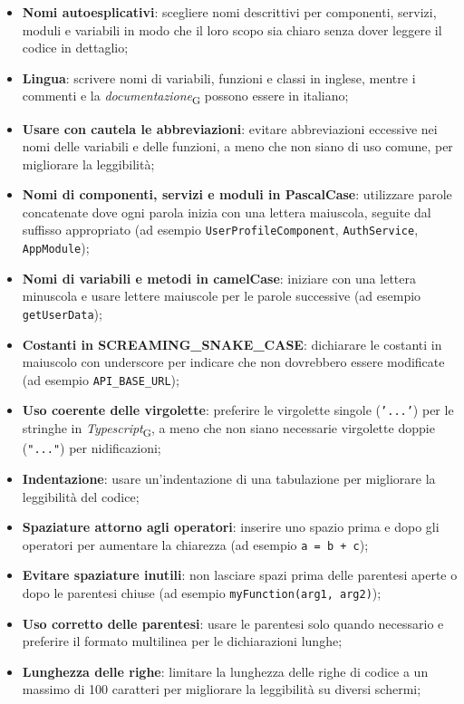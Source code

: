 \begin{itemize}
    \item \textbf{Nomi autoesplicativi}: scegliere nomi descrittivi per componenti, servizi, moduli e variabili in modo che il loro scopo sia chiaro senza dover leggere il codice in dettaglio;
    \item \textbf{Lingua}: scrivere nomi di variabili, funzioni e classi in inglese, mentre i commenti e la \textit{documentazione}\textsubscript{G} possono essere in italiano;
    \item \textbf{Usare con cautela le abbreviazioni}: evitare abbreviazioni eccessive nei nomi delle variabili e delle funzioni, a meno che non siano di uso comune, per migliorare la leggibilità;
    \item \textbf{Nomi di componenti, servizi e moduli in PascalCase}: utilizzare parole concatenate dove ogni parola inizia con una lettera maiuscola, seguite dal suffisso appropriato (ad esempio \texttt{UserProfileComponent}, \texttt{AuthService}, \texttt{AppModule});
    \item \textbf{Nomi di variabili e metodi in camelCase}: iniziare con una lettera minuscola e usare lettere maiuscole per le parole successive (ad esempio \texttt{getUserData});
    \item \textbf{Costanti in SCREAMING\_SNAKE\_CASE}: dichiarare le costanti in maiuscolo con underscore per indicare che non dovrebbero essere modificate (ad esempio \texttt{API\_BASE\_URL});
    \item \textbf{Uso coerente delle virgolette}: preferire le virgolette singole (\texttt{'...'}) per le stringhe in \textit{Typescript}\textsubscript{G}, a meno che non siano necessarie virgolette doppie (\texttt{"..."}) per nidificazioni;
    \item \textbf{Indentazione}: usare un'indentazione di una tabulazione per migliorare la leggibilità del codice;
    \item \textbf{Spaziature attorno agli operatori}: inserire uno spazio prima e dopo gli operatori per aumentare la chiarezza (ad esempio \texttt{a = b + c});
    \item \textbf{Evitare spaziature inutili}: non lasciare spazi prima delle parentesi aperte o dopo le parentesi chiuse (ad esempio \texttt{myFunction(arg1, arg2)});
    \item \textbf{Uso corretto delle parentesi}: usare le parentesi solo quando necessario e preferire il formato multilinea per le dichiarazioni lunghe;
    \item \textbf{Lunghezza delle righe}: limitare la lunghezza delle righe di codice a un massimo di 100 caratteri per migliorare la leggibilità su diversi schermi;

\end{itemize}
